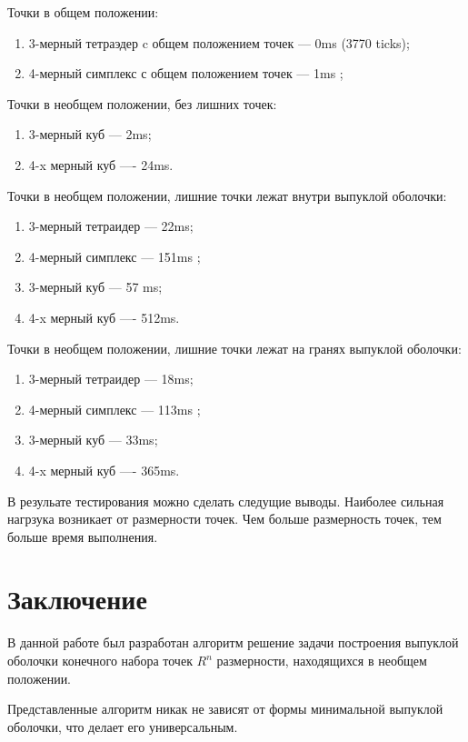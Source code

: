 \documentclass[14pt]{extarticle}
\begin{document}
Точки в общем положении:
\begin{enumerate}[topsep=-0.5\parsep,itemsep=-0.5\parsep]
  \item 3-мерный тетраэдер c общем положением точек --- 0ms (3770 ticks);
  \item 4-мерный симплекс с общем положением точек --- 1ms ;
\end{enumerate}
\medskip
Точки в необщем положении, без лишних точек:
\begin{enumerate}[topsep=-0.5\parsep,itemsep=-0.5\parsep]
        \item 3-мерный куб  --- 2ms;
        \item 4-x мерный куб ---- 24ms.
\end{enumerate}
\medskip
Точки в необщем положении, лишние точки лежат внутри выпуклой оболочки:
\begin{enumerate}[topsep=-0.5\parsep,itemsep=-0.5\parsep]
        \item 3-мерный тетраидер --- 22ms;
        \item 4-мерный симплекс  --- 151ms ;
        \item 3-мерный куб  --- 57 ms;
        \item 4-x мерный куб ---- 512ms.
\end{enumerate}
Точки в необщем положении, лишние точки лежат на гранях выпуклой оболочки:
\begin{enumerate}[topsep=-0.5\parsep,itemsep=-0.5\parsep]
        \item 3-мерный тетраидер --- 18ms;
        \item 4-мерный симплекс  --- 113ms ;
        \item 3-мерный куб  --- 33ms;
        \item 4-x мерный куб ---- 365ms.
\end{enumerate}
\medskip

В резульате тестирования можно сделать следущие выводы.
Наиболее сильная нагрзука возникает от размерности точек. Чем больше размерность точек, тем больше время выполнения.
\newpage

\section*{Заключение}
В данной работе был разработан алгоритм решение задачи построения выпуклой оболочки конечного набора точек $R^n$ размерности, находящихся в необщем положении.

Представленные алгоритм никак не зависят от формы
минимальной выпуклой оболочки, что делает его универсальным.
\end{document}
